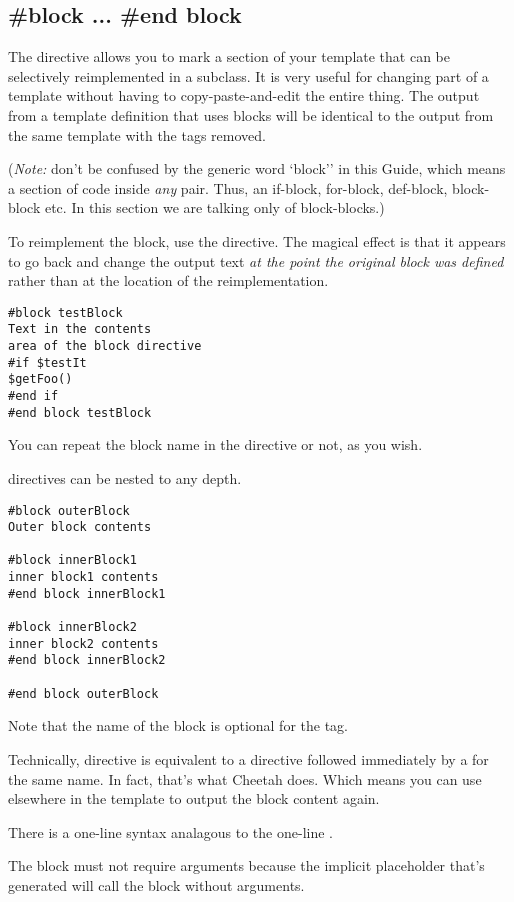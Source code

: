 \subsection{\#block ... \#end block}
\label{inheritanceEtc.block}


The  directive allows you to mark a section of your template that
can be selectively reimplemented in a subclass.  It is very useful for
changing part of a template without having to copy-paste-and-edit
the entire thing.  The output from a template definition that uses blocks will
be identical to the output from the same template with the  tags removed. 

({\em Note:} don't be confused by the generic word `block'' in this Guide,
which means a section of code inside {\em any} 
pair.  Thus, an if-block, for-block, def-block, block-block etc.  In this
section we are talking only of block-blocks.)

To reimplement the block, use the  directive.  The magical effect
is that it appears to go back and change the output text {\em at the point the
original block was defined} rather than at the location of the
reimplementation.

\begin{verbatim}
#block testBlock
Text in the contents 
area of the block directive
#if $testIt
$getFoo() 
#end if
#end block testBlock
\end{verbatim}

You can repeat the block name in the  directive or not, as
you wish.

 directives can be nested to any depth.

\begin{verbatim}
#block outerBlock
Outer block contents 

#block innerBlock1
inner block1 contents 
#end block innerBlock1

#block innerBlock2
inner block2 contents 
#end block innerBlock2

#end block outerBlock
\end{verbatim}

Note that the name of the block is optional for the  tag.

Technically,  directive is equivalent to a  directive
followed immediately by a  for the same name.  In fact,
that's what Cheetah does.  Which means you can use 
elsewhere in the template to output the block content again.

There is a one-line  syntax analagous to the one-line 
.  

The block must not require arguments because the implicit placeholder that's
generated will call the block without arguments.


